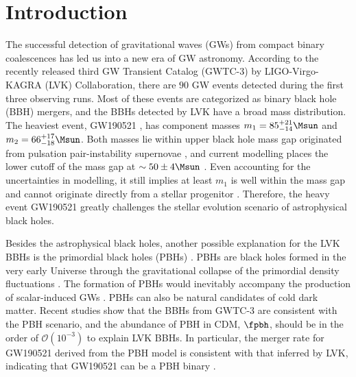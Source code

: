 \documentclass[
reprint,           %
superscriptaddress,%
amsmath,           %
amssymb,           %
aps,               %
prd,               %
notitlepage,       %
longbibliography,  %
floatfix,          %
nofootinbib,
]{revtex4-1}
\begin{document}
\maketitle

\section{Introduction}

The successful detection of gravitational waves (GWs) from compact binary coalescences \cite{LIGOScientific:2018mvr,LIGOScientific:2020ibl,LIGOScientific:2021djp} has led us into a new era of GW astronomy.
According to the recently released third GW Transient Catalog (GWTC-3) \cite{LIGOScientific:2021djp} by LIGO-Virgo-KAGRA (LVK) Collaboration, there are $90$ GW events detected during the first three observing runs. Most of these events are categorized as binary black hole (BBH) mergers, and the BBHs detected by LVK have a broad mass distribution. The heaviest event, GW190521 \cite{LIGOScientific:2020iuh}, has component masses $m_1 = 85^{+21}_{-14}\Msun$ and $m_2 = 66^{+17}_{-18}\Msun$. Both masses lie within upper black hole mass gap originated from pulsation pair-instability supernovae \cite{Marchant_2019}, and current modelling places the lower cutoff of the mass gap at $\sim 50\pm 4\Msun$ \cite{belczynski2016effect,Marchant_2019,Farmer_2019,Farmer:2020xne,Marchant:2020haw}.
Even accounting for the uncertainties in modelling, it still implies at least $m_1$ is well within the mass gap and cannot originate directly from a stellar progenitor \cite{Anagnostou:2020umw}.
Therefore, the heavy event GW190521 greatly challenges the stellar evolution scenario of astrophysical black holes.

Besides the astrophysical black holes, another possible explanation for the LVK BBHs is the primordial black holes (PBHs) \cite{Bird:2016dcv,Sasaki:2016jop,Chen:2018czv,Liu:2018ess,Chen:2021nxo}. 
PBHs are black holes formed in the very early Universe through the gravitational collapse of the primordial density fluctuations \cite{Hawking:1971ei,Carr:1974nx}. The formation of PBHs would inevitably accompany the production of scalar-induced GWs \cite{Saito:2008jc,Yuan:2019udt,Yuan:2019wwo,Yuan:2019fwv,Chen:2019xse,DeLuca:2019ufz,Bartolo:2018rku,Bartolo:2018evs}. PBHs can also be natural candidates of cold dark matter. Recent studies \cite{Chen:2021nxo,Chen:2022fda} show that the BBHs from GWTC-3 are consistent with the PBH scenario, and the abundance of PBH in CDM, $\fpbh$, should be in the order of $\mathcal{O}(10^{-3})$ to explain LVK BBHs. In particular, the merger rate for GW190521 derived from the PBH model is consistent with that inferred by LVK, indicating that GW190521 can be a PBH binary \cite{DeLuca:2020sae,Chen:2021nxo}.
\end{document}
